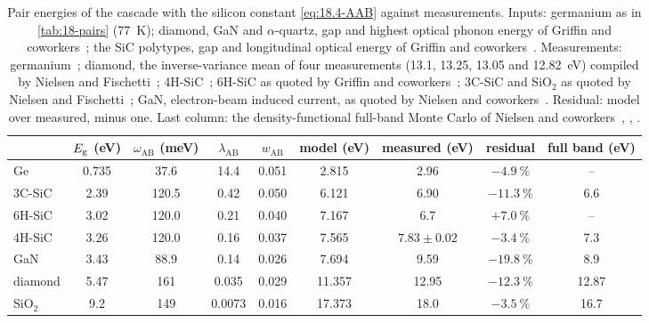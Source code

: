 \begin{table}[tbp]
\caption{Pair energies of the cascade with the silicon constant \cref{eq:18.4-AAB} against measurements. Inputs: germanium as in \cref{tab:18-pairs} (\SI{77}{K}); diamond, GaN and $\alpha$-quartz, gap and highest optical phonon energy of Griffin and coworkers~\cite[Table~I]{griffin2020multichannel}; the SiC polytypes, gap and longitudinal optical energy of Griffin and coworkers~\cite[Table~I]{griffin2021sic}. Measurements: germanium~\cite[Sect.~4.3]{mei2020impact}; diamond, the inverse-variance mean of four measurements (13.1, 13.25, 13.05 and \SI{12.82}{eV}) compiled by Nielsen and Fischetti~\cite[Sect.~III]{nielsen2023thermalization}; 4H-SiC~\cite{gsponer2023measurement}; 6H-SiC as quoted by Griffin and coworkers~\cite[Table~I]{griffin2021sic}; 3C-SiC and SiO$_2$ as quoted by Nielsen and Fischetti~\cite[Table~II]{nielsen2026first}; GaN, electron-beam induced current, as quoted by Nielsen and coworkers~\cite[Sect.~IV]{nielsen2023first}. Residual: model over measured, minus one. Last column: the density-functional full-band Monte Carlo of Nielsen and coworkers~\cite[Table~II]{nielsen2026first}, \cite[Sect.~III]{nielsen2023thermalization}, \cite[Sect.~IV]{nielsen2023first}.}
\label{tab:18-valid}
\centering\footnotesize\setlength{\tabcolsep}{3pt}
\begin{tabular}{lcccccccc}
\toprule
 & $E_{\mathrm{g}}$ (eV) & $\omega_{\mathrm{AB}}$ (meV) & $\lambda_{\mathrm{AB}}$ & $w_{\mathrm{AB}}$ & model (eV) & measured (eV) & residual & full band (eV) \\
\midrule
Ge & 0.735 & 37.6 & 14.4 & 0.051 & 2.815 & 2.96 & $-\SI{4.9}{\percent}$ & -- \\
3C-SiC & 2.39 & 120.5 & 0.42 & 0.050 & 6.121 & 6.90 & $-\SI{11.3}{\percent}$ & 6.6 \\
6H-SiC & 3.02 & 120.0 & 0.21 & 0.040 & 7.167 & 6.7 & $+\SI{7.0}{\percent}$ & -- \\
4H-SiC & 3.26 & 120.0 & 0.16 & 0.037 & 7.565 & $7.83 \pm 0.02$ & $-\SI{3.4}{\percent}$ & 7.3 \\
GaN & 3.43 & 88.9 & 0.14 & 0.026 & 7.694 & 9.59 & $-\SI{19.8}{\percent}$ & 8.9 \\
diamond & 5.47 & 161 & 0.035 & 0.029 & 11.357 & 12.95 & $-\SI{12.3}{\percent}$ & 12.87 \\
SiO$_2$ & 9.2 & 149 & 0.0073 & 0.016 & 17.373 & 18.0 & $-\SI{3.5}{\percent}$ & 16.7 \\
\bottomrule
\end{tabular}
\end{table}

